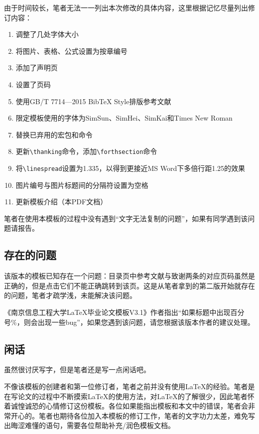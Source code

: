 由于时间较长，笔者无法一一列出本次修改的具体内容，这里根据记忆尽量列出修订内容：
\begin{enumerate}[1、]
    \item 调整了几处字体大小
    \item 将图片、表格、公式设置为按章编号
    \item 添加了声明页
    \item 设置了页码
    \item 使用GB/T 7714—2015 BibTeX Style排版参考文献
    \item 限定模板使用的字体为SimSun、SimHei、SimKai和Times New Roman
    \item 替换已弃用的宏包和命令
    \item 更新\verb|\thanking|命令，添加\verb|\forthsection|命令
    \item 将\verb|\linespread|设置为1.335，以得到更接近MS Word下多倍行距1.25的效果
    \item 图片编号与图片标题间的分隔符设置为空格
    \item 更新模板介绍（本PDF文档）
\end{enumerate}

笔者在使用本模板的过程中没有遇到“文字无法复制的问题”，如果有同学遇到该问题请报告。

\subsection{存在的问题}

该版本的模板已知存在一个问题：目录页中参考文献与致谢两条的对应页码虽然是正确的，但是点击它们不能正确跳转到该页。这是从笔者拿到的第二版开始就存在的问题，笔者才疏学浅，未能解决该问题。

《南京信息工程大学LaTeX毕业论文模板V3.1》作者指出“如果标题中出现百分号{\color{blue}\%}，则会出现一些bug”，如果您遇到该问题，请您根据该版本作者的建议处理。

\subsection{闲话}

虽然很讨厌写字，但是笔者还是写一点闲话吧。

不像该模板的创建者和第一位修订者，笔者之前并没有使用\LaTeX 的经验。笔者是在写论文的过程中不断摸索\LaTeX 的使用方法，对\LaTeX 的了解很少，因此笔者怀着诚惶诚恐的心情修订这份模板。各位如果能指出模板和本文中的错误，笔者会非常开心的。笔者也期待各位加入本模板的修订工作，笔者的文字功力太差，难免写出晦涩难懂的语句，需要各位帮助补充/润色模板文档。

